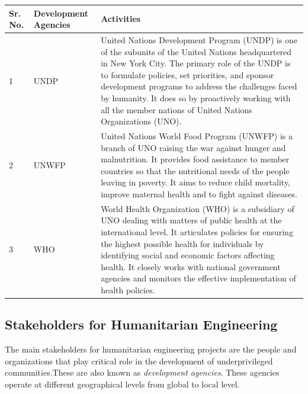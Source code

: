 \documentclass[10pt]{IETBook}
\begin{document}
\begin{table}[t]
\begin{center}
\begin{tabular}{|p{0.15in}|p{0.66in}| p{3.2in}|}
\hline
Sr. No. & Development \newline Agencies & Activities \\ \hline 
1 & UNDP & United Nations Development Program (UNDP) is one of the subunits of the United Nations headquartered in New York City. The primary role of the UNDP is to formulate policies, set priorities, and sponsor development programs to address the challenges faced by humanity. It does so by proactively working with all the member nations of United Nations Organizations (UNO).\cite{mccall2013undp} \\ \hline

2 & UNWFP & United Nations World Food Program (UNWFP) is a branch of UNO raising the war against hunger and malnutrition. It provides food assistance to member countries so that the nutritional needs of the people leaving in poverty. It aims to reduce child mortality, improve maternal health and to fight against diseases. \cite{fao2015wfp}\\ \hline
     
3 & WHO & World Health Organization (WHO) is a subsidiary of UNO dealing with matters of public health at the international level. It articulates policies for ensuring the highest possible health for individuals by identifying social and economic factors affecting health. It closely works with national government agencies and monitors the effective implementation of health policies. \cite{world2002traditional}\\ \hline 
\end{tabular}
\label{international}
\end{center}
\end{table}

\subsection{Stakeholders for Humanitarian Engineering}
The main stakeholders for humanitarian engineering projects are the people and organizations that play critical role in the development of underprivileged communities.These are also known as {\em development agencies}. These agencies operate at different geographical levels from global to local level.
\end{document}
